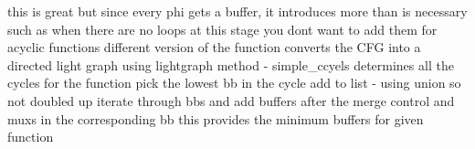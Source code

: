 this is great but since every phi gets a buffer, it introduces more than is necessary such as when there are no loops
	at this stage you dont want to add them for acyclic functions	
	different version of the function converts the CFG into a directed light graph
	using lightgraph method - simple\_ccyels
		determines all the cycles for the function 
		pick the lowest bb in the cycle
		add to list - using union so not doubled up
		iterate through bbs and add buffers after the merge control and muxs in the corresponding bb
		this provides the minimum buffers for given function
\fi

